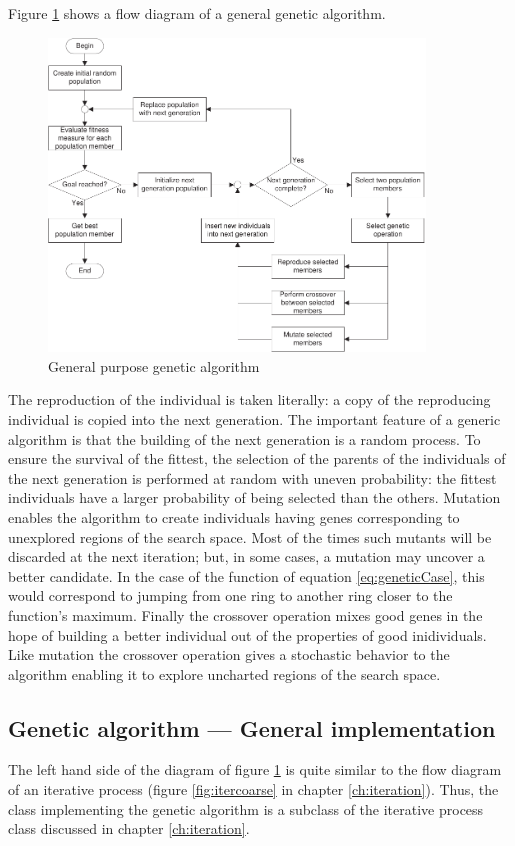 Figure \ref{fig:geneticFlow} shows a flow diagram of a general
genetic algorithm.
\begin{figure}
\centering\includegraphics[width=10cm]{Figures/GeneticFlow}
\caption{General purpose genetic algorithm}\label{fig:geneticFlow}
\end{figure}
The reproduction of the individual is taken literally: a copy of
the reproducing individual is copied into the next generation. The
important feature of a generic algorithm is that the building of
the next generation is a random process. To ensure the survival of
the fittest, the selection of the parents of the individuals of
the next generation is performed at random with uneven
probability: the fittest individuals have a larger probability of
being selected than the others. Mutation enables the algorithm to
create individuals having genes corresponding to unexplored
regions of the search space. Most of the times such mutants will
be discarded at the next iteration; but, in some cases, a mutation
may uncover a better candidate. In the case of the function of
equation \ref{eq:geneticCase}, this would correspond to jumping
from one ring to another ring closer to the function's maximum.
Finally the crossover operation mixes good genes in the hope of
building a better individual out of the properties of good
inidividuals. Like mutation the crossover operation gives a
stochastic behavior to the algorithm enabling it to explore
uncharted regions of the search space.


\subsection{Genetic algorithm --- General implementation}
\label{sec:gengenetic} The left hand side of the diagram of figure
\ref{fig:geneticFlow} is quite similar to the flow diagram of an
iterative process (\cf figure \ref{fig:itercoarse} in chapter
\ref{ch:iteration}). Thus, the class implementing the genetic
algorithm is a subclass of the iterative process class discussed
in chapter \ref{ch:iteration}.

